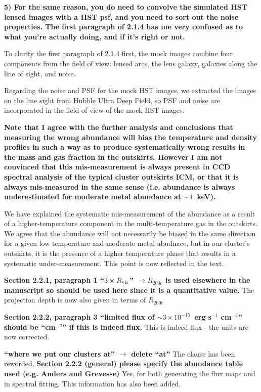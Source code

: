 \documentclass{article}
\begin{document}
{\bf 5) For the same reason, you do need to convolve the simulated HST
  lensed images with a HST psf, and you need to sort out the noise
  properties. The first paragraph of 2.1.4 has me very confused as to
  what you're actually doing, and if it's right or not.}

To clarify the first paragraph of 2.1.4 first, the mock images combine
four components from the field of view: lensed arcs, the lens galaxy,
galaxies along the line of sight, and noise.

Regarding the noise and PSF for the mock HST images, we extracted the
images on the line sight from Hubble Ultra Deep Field, so PSF and
noise are incorporated in the field of view of the mock HST images.

{\bf 
Note that I agree with the further analysis and conclusions that measuring
the wrong abundance will bias the temperature and density profiles in such
a way as to produce systematically wrong results in the mass and gas
fraction in the outskirts. However I am not convinced that this
mis-measurement is always present in CCD spectral analysis of the typical
cluster outskirts ICM, or that it is always mis-measured in the same sense
(i.e. abundance is always underestimated for moderate metal abundance at $\sim
1$~keV).
}

We have explained the systematic mis-measurement of the abundance as a
result of a higher-temperature component in the multi-temperature gas in
the outskirts.  We agree that the abundance will not necessarily be
biased in the same direction for a given low temperature and moderate
metal abudnace, but in our cluster's outskirts, it is the presence of
a higher temperature phase that results in a systematic
under-measurement.  This point is now reflected in the text. 

{\bf 
Section 2.2.1, paragraph 1
``$3\times  R_{\rm vir}$'' $\rightarrow R_{200c}$ is used elsewhere in the manuscript so should be used
here since it is a quantitative value.
}
The projection depth is now also given in terms of ${R}_{200c}$

{\bf 
Section 2.2.2, paragraph 3
``limited flux of $\sim 3 \times 10^{-15}$~erg s$^{-1}$ cm$^{-3}$'' should be ``cm$^{-2}$'' if this
is indeed flux.
}
This is indeed flux - the units are now corrected.

{\bf 
``where we put our clusters at'' $\rightarrow$ delete ``at''
}
The clause has been reworded.
{\bf 
Section 2.2.2 (general)
please specify the abundance table used (e.g. Anders and Grevesse)
}
Yes, for both generating the flux maps and in spectral fitting. This
information has also been added.
\end{document}
